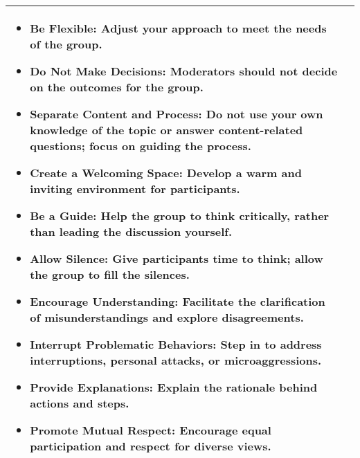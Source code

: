 \begin{longtable}{|p{3cm}|p{10cm}|}
\begin{itemize}
        \item \textbf{Be Flexible}: Adjust your approach to meet the needs of the group.
        \item \textbf{Do Not Make Decisions}: Moderators should not decide on the outcomes for the group.
        \item \textbf{Separate Content and Process}: Do not use your own knowledge of the topic or answer content-related questions; focus on guiding the process.
        \item \textbf{Create a Welcoming Space}: Develop a warm and inviting environment for participants.
        \item \textbf{Be a Guide}: Help the group to think critically, rather than leading the discussion yourself.
        \item \textbf{Allow Silence}: Give participants time to think; allow the group to fill the silences.
        \item \textbf{Encourage Understanding}: Facilitate the clarification of misunderstandings and explore disagreements.
        \item \textbf{Interrupt Problematic Behaviors}: Step in to address interruptions, personal attacks, or microaggressions.
        \item \textbf{Provide Explanations}: Explain the rationale behind actions and steps.
        \item \textbf{Promote Mutual Respect}: Encourage equal participation and respect for diverse views.
    \end{itemize} \\
    \hline
\end{longtable}


